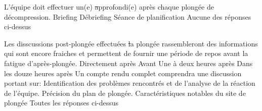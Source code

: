 \documentclass[english,10pt,twoside]{article}
\begin{document}
\begin{outline}
		\1 L'équipe doit effectuer un(e) \st approfondi(e) après chaque plongée de décompression.
			\2 Briefing
			\2 Débriefing
			\2 Séance de planification
			\2 Aucune des réponses ci-dessus 

		\1 Les disscussions post-plongée effectuées \st la plongée rassembleront des informations qui sont encore fraiches et permettent de fournir une période de repos avant la fatigue d'après-plongée.
			\2 Directement après
			\2 Avant
			\2 Une à deux heures après
			\2 Dans les douze heures après
		\1 Un compte rendu complet comprendra une discussion portant sur:
			\2 Identification des problèmes rencontrés et de l'analyse de la réaction de l'équipe.
			\2 Précision du plan de plongée.
			\2 Caractéristiques notables du site de plongée
			\2 Toutes les réponses ci-dessus

	\end{outline}
\end{document}
